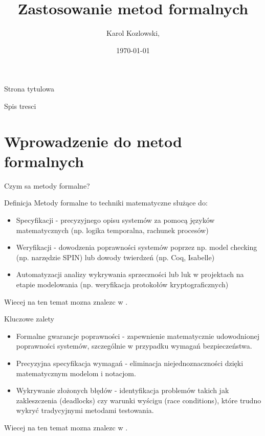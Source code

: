 \documentclass{beamer}
\title{Zastosowanie metod formalnych}
\author{Karol Kozlowski,}
\institute{Wydzial elektryczny, Politechnika Warszawska}
\date{\today}
\begin{document}
\begin{frame}{Strona tytulowa}
\titlepage
\end{frame}

\begin{frame}{Spis tresci}
\tableofcontents
\end{frame}

\section{Wprowadzenie do metod formalnych}
\begin{frame}{Czym sa metody formalne?}
\begin{block}{Definicja}
  Metody formalne to techniki matematyczne służące do:
\begin{itemize}
\item Specyfikacji - precyzyjnego opisu systemów za pomocą języków matematycznych (np. logika temporalna, rachunek procesów)
\item Weryfikacji - dowodzenia poprawności systemów poprzez np. model checking (np. narzędzie SPIN) lub dowody twierdzeń (np. Coq, Isabelle)
\item Automatyzacji analizy  wykrywania sprzeczności lub luk w projektach na etapie modelowania (np. weryfikacja protokołów kryptograficznych)
\end{itemize}
Wiecej na ten temat mozna znalezc w \cite{spin_needham_schroeder}.
\end{block}
\end{frame}

\begin{frame}
\begin{exampleblock}{Kluczowe zalety}
\begin{itemize}
\item Formalne gwarancje poprawności - zapewnienie matematycznie udowodnionej poprawności systemów, szczególnie w przypadku wymagań bezpieczeństwa.
\item Precyzyjna specyfikacja wymagań - eliminacja niejednoznaczności dzięki matematycznym modelom i notacjom.
\item Wykrywanie złożonych błędów - identyfikacja problemów takich jak zakleszczenia (deadlocks) czy warunki wyścigu (race conditions), które trudno wykryć tradycyjnymi metodami testowania.
\end{itemize}
Wiecej na ten temat mozna znalezc w \cite{wojnicki2019weryfikacja}.
\end{exampleblock}

\end{frame}
\end{document}
